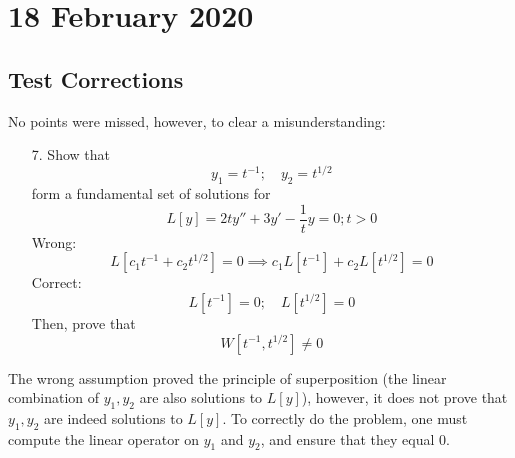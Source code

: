 \documentclass[diffeq.tex]{subfiles}
\begin{document}
\chapter{18 February 2020}
    \section{Test Corrections}
    No points were missed, however, to clear a misunderstanding:
    \begin{enumerate}
        \item[7.] Show that
        \begin{equation}
            y_{1} = t^{-1};\quad y_{2} = t^{1/2}
        \end{equation}
        form a fundamental set of solutions for
        \begin{equation}
            L[y] = 2ty'' + 3y' - \frac{1}{t}y = 0; t > 0
        \end{equation}
        Wrong:
        \begin{equation}
            L[c_{1}t^{-1} + c_{2}t^{1/2}] = 0 \implies c_{1}L[t^{-1}] + c_{2}L[t^{1/2}] = 0
        \end{equation}
        Correct:
        \begin{equation}
            L[t^{-1}] = 0;\quad L[t^{1/2}] = 0
        \end{equation}
        Then, prove that
        \begin{equation}
            W[t^{-1}, t^{1/2}] \neq 0
        \end{equation}
    \end{enumerate}
    The wrong assumption proved the principle of superposition (the linear combination of $y_{1}, y_{2}$ are also solutions to $L[y]$), however, it does not prove that $y_{1}, y_{2}$ are indeed solutions to $L[y]$.
    To correctly do the problem, one must compute the linear operator on $y_{1}$ and $y_{2}$, and ensure that they equal 0.
\end{document}
